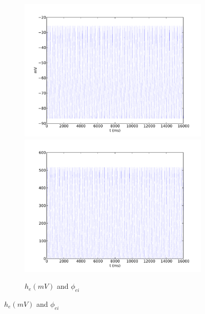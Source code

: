 \documentclass[a4paper,12pt]{article}
\begin{document}
\begin{figure}
	\begin{subfigure}[b]{1\textwidth}
		\includegraphics[scale=0.32]{chosen-frontiers-2012/00214-1-0_5-5-0_5-he-phi.pdf}
		\includegraphics[scale=0.32]{chosen-frontiers-2012/00214-1-0_5-5-0_5-phi_ei-phi}
		\label{fig:214-1-0_5-5-0_5}
		\caption{$h_e (mV)$ and $\phi_{ei}$}
	\end{subfigure}


\end{figure}
\end{document}
